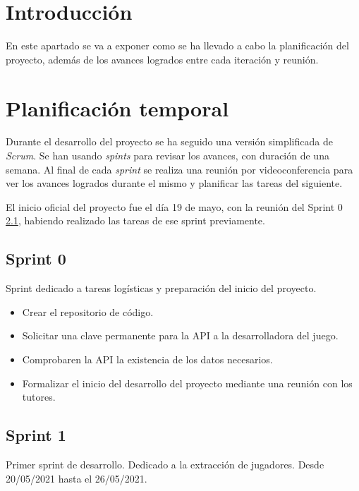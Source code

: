 
\section{Introducción}

En este apartado se va a exponer como se ha llevado a cabo la planificación del proyecto, además de los avances logrados entre cada iteración y reunión.

\section{Planificación temporal}

Durante el desarrollo del proyecto se ha seguido una versión simplificada de \textit{Scrum}. Se han usando \textit{spints} para revisar los avances, con duración de una semana. Al final de cada \textit{sprint} se realiza una reunión por videoconferencia para ver los avances logrados durante el mismo y planificar las tareas del siguiente.

El inicio oficial del proyecto fue el día 19 de mayo, con la reunión del Sprint 0 \ref{sprint-0}, habiendo realizado las tareas de ese sprint previamente.

\subsection{Sprint 0}\label{sprint-0}

Sprint dedicado a tareas logísticas y preparación del inicio del proyecto.

\begin{itemize}
    \item Crear el repositorio de código.
    \item Solicitar una clave permanente para la API a la desarrolladora del juego.
    \item Comprobaren la API la existencia de los datos necesarios.
    \item Formalizar el inicio del desarrollo del proyecto mediante una reunión con los tutores.
\end{itemize}

\subsection{Sprint 1}

Primer sprint de desarrollo. Dedicado a la extracción de jugadores. Desde 20/05/2021 hasta el 26/05/2021.

